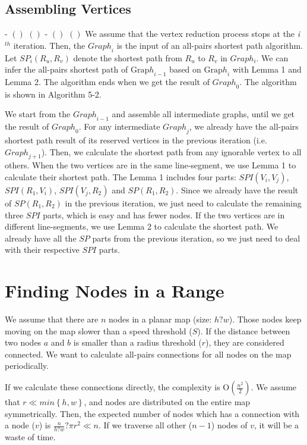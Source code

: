 \subsection{ Assembling Vertices}

\noindent - $\left(\right)$                                       $\left(\right)$      - $\left(\right)$                                       $\left(\right)$      We assume that the vertex reduction process stops at the \textit{i}${}^{th}$ iteration. Then, the ${Graph}_i$ is the input of an all-pairs shortest path algorithm. Let $SP_i\left(R_u,R_v\right)$ denote the shortest path from $R_u$ to $R_v$ in $Graph_i$. We can infer the all-pairs shortest path of ${\mathrm{Grap}h}_{i-1}$ based on ${\mathrm{Grap}h}_i$ with Lemma 1 and Lemma 2. The algorithm ends when we get the result of ${Graph}_0$. The algorithm is shown in Algorithm 5-2.

\noindent We start from the ${Graph}_{i-1}$ and assemble all intermediate graphs, until we get the result of ${Graph}_0$. For any intermediate ${Graph}_j$, we already have the all-pairs shortest path result of its reserved vertices in the previous iteration (i.e. ${Graph}_{j+1}$). Then, we calculate the shortest path from any ignorable vertex to all others. When the two vertices are in the same line-segment, we use Lemma 1 to calculate their shortest path. The Lemma 1 includes four parts: $SPI\left(V_i,V_j\right)$, $SPI\left(R_1,V_i\right)$, $SPI\left(V_j,R_2\right)$ and $SP\left(R_1,R_2\right)$. Since we already have the result of $SP\left(R_1,R_2\right)$ in the previous iteration, we just need to calculate the remaining three $SPI$ parts, which is easy and has fewer nodes. If the two vertices are in different line-segments, we use Lemma 2 to calculate the shortest path. We already have all the $SP$ parts from the previous iteration, so we just need to deal with their respective $SPI$ parts.


\section{ Finding Nodes in a Range}

\noindent We assume that there are $n$ nodes in a planar map (size: $h?w$). Those nodes keep moving on the map slower than a speed threshold ($S$). If the distance between two nodes $a$ and $b$ is smaller than a radius threshold ($r$), they are considered connected. We want to calculate all-pairs connections for all nodes on the map periodically. 

\noindent If we calculate these connections directly, the complexity is $\mathrm{O}\left(\frac{n^2}{2}\right)$. We assume that $r\ll min\left\{h,w\right\}$, and nodes are distributed on the entire map symmetrically. Then, the expected number of nodes which has a connection with a node ($v$) is $\frac{n}{h\mathrm{?}w}\mathrm{?}\pi r^2\mathrm{\ll }n$. If we traverse all other ($n-1$) nodes of $v$, it will be a waste of time.

